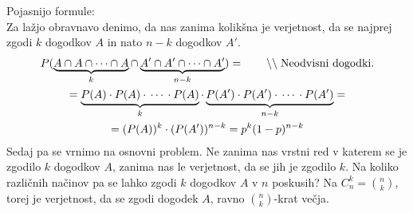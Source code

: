 \documentclass[a4paper,oneside,12pt,fleqn]{article}
\newcommand\krat\cdot
\newcommand{\comment}[1]{\ensuremath{\qquad\backslash\backslash\;}\textnormal{#1}}
\numberwithin{equation}{section}
\begin{document}
Pojasnijo formule:\\
Za lažjo obravnavo denimo, da nas zanima kolikšna je verjetnost, da se najprej zgodi
$k$ dogodkov $A$ in nato $n-k$ dogodkov $A'$.
\begin{gather*}
  P(\underbrace{A \cap A \cap \cdots \cap A}_k \cap \underbrace{A' \cap A' \cap \cdots
  \cap A'}_{n-k}) = \comment{Neodvisni dogodki.}\\
  = \underbrace{P(A)\krat P(A) \krat \, \cdots \, \krat P(A)}_k \krat
  \underbrace{P(A')\krat P(A')\krat \, \cdots \, \krat P(A')}_{n-k} = \\
  = (P(A))^k \krat (P(A'))^{n-k} = p^k(1-p)^{n-k}
\end{gather*}
Sedaj pa se vrnimo na osnovni problem. Ne zanima nas vrstni red v katerem se je zgodilo
$k$ dogodkov $A$, zanima nas le verjetnost, da se jih je zgodilo $k$. Na koliko
različnih načinov pa se lahko zgodi $k$ dogodkov $A$ v $n$ poskusih? Na $C^k_n =
\binom{n}{k}$, torej je verjetnost, da se zgodi dogodek $A$, ravno $\binom{n}{k}$-krat večja.


\pagebreak
\listoffigures
\listoftables
\end{document}
